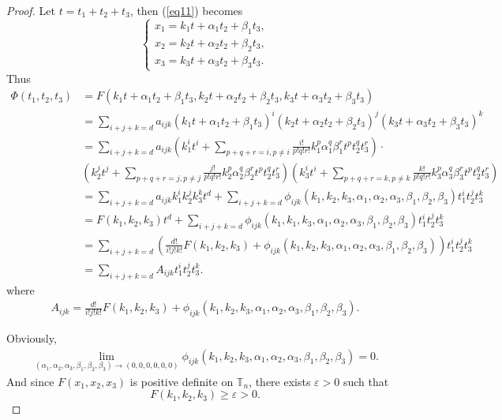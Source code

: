 \documentclass [10pt,a4paper]{article}
\begin{document}
\begin{proof}
Let $t=t_1+t_2+t_3$, then (\ref{eq11})  becomes
\begin{equation}
\left\{ \begin{array}{l} x_1  = k_{1}t+\alpha_1t_2+\beta_1t_3,\\
x_2  =  k_{2}t+\alpha_2t_2+\beta_2t_3,\\
x_3  =  k_{3}t+\alpha_3t_2+\beta_3t_3.
\end{array}\right.
\end{equation}
Thus
\begin{equation}
\begin{split}
\Phi(t_1,t_2,t_3) & = F(k_{1}t+\alpha_1t_2+\beta_1t_3,
k_{2}t+\alpha_2t_2+\beta_2t_3,k_{3}t+\alpha_3t_2+\beta_3t_3)\\
 & =
\sum\limits_{i+j+k=d}a_{ijk}(k_{1}t+\alpha_1t_2+\beta_1t_3)^i(k_{2}t+\alpha_2t_2+\beta_2t_3)^j(k_{3}t+\alpha_3t_2+\beta_3t_3)^k \\
&=
\sum\limits_{i+j+k=d}a_{ijk}(k_{1}^it^i+\sum\limits_{p+q+r=i,p\neq
i}\frac{i!}{p!q!r!}k_1^p\alpha_1^q\beta_1^rt^pt_2^qt_3^r)\cdot\\
&(k_{2}^jt^j+\sum\limits_{p+q+r=j,p\neq
j}\frac{j!}{p!q!r!}k_2^p\alpha_2^q\beta_2^rt^pt_2^qt_3^r)(k_{3}^it^i+\sum\limits_{p+q+r=k,p\neq
k}\frac{k!}{p!q!r!}k_3^p\alpha_3^q\beta_3^rt^pt_2^qt_3^r)
\\
&
=\sum\limits_{i+j+k=d}a_{ijk}k_{1}^ik_{2}^jk_{3}^kt^d+\sum\limits_{i+j+k=d}\phi_{ijk}(k_{1},k_{2},k_{3},\alpha_1,\alpha_2,\alpha_3,\beta_1,\beta_2,\beta_3)t_1^it_2^jt_3^k\\
&
=F(k_{1},k_{2},k_{3})t^d+\sum\limits_{i+j+k=d}\phi_{ijk}(k_{1},k_{1},k_{3},\alpha_1,\alpha_2,\alpha_3,\beta_1,\beta_2,\beta_3)t_1^it_2^jt_3^k\\
&
=\sum\limits_{i+j+k=d}\left({\frac{d!}{i!j!k!}}F(k_{1},k_{2},k_{3})+\phi_{ijk}(k_{1},k_{2},k_{3},\alpha_1,\alpha_2,\alpha_3,\beta_1,\beta_2,\beta_3)\right)t_1^it_2^jt_3^k\\
& =\sum\limits_{i+j+k=d}A_{ijk}t_1^it_2^jt_3^k.
\end{split}
\end{equation}
where
\begin{equation}\label{aaa}
\begin{split}
A_{ijk}={\frac{d!}{i!j!k!}}F(k_{1},k_{2},k_{3})+\phi_{ijk}(k_{1},k_{2},k_{3},\alpha_1,\alpha_2,\alpha_3,\beta_1,\beta_2,\beta_3).
\end{split}
\end{equation}

Obviously,
\begin{equation}\label{bbb}
\begin{split}
\lim_{(\alpha_1,\alpha_2,\alpha_3,\beta_1,\beta_2,\beta_3)\rightarrow(0,0,0,0,0,0)}\phi_{ijk}(k_{1},k_{2},k_{3},\alpha_1,\alpha_2,\alpha_3,\beta_1,\beta_2,\beta_3)=0.
\end{split}
\end{equation}
And  since  $F(x_1,x_2,x_3)$ is positive def\mbox{}inite on
$\mathbb{T}_n$,  there exists $\varepsilon>0$ such that
\begin{equation}\label{ccc}
F(k_{1},k_{2},k_{3})\geq\varepsilon>0. \end{equation}



\end{proof}
\end{document}
